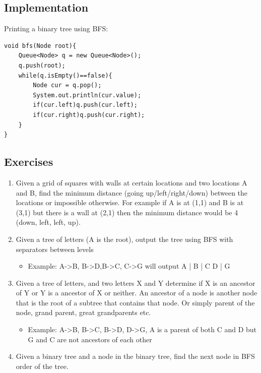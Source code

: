 \documentclass[11pt,oneside]{book}
\begin{document}
\subsection{Implementation}

Printing a binary tree using BFS:

\begin{lstlisting}
void bfs(Node root){
    Queue<Node> q = new Queue<Node>();
    q.push(root);
    while(q.isEmpty()==false){
        Node cur = q.pop();
        System.out.println(cur.value);
        if(cur.left)q.push(cur.left);
        if(cur.right)q.push(cur.right);
    }
}
\end{lstlisting}

\subsection{Exercises}

\begin{enumerate}
\item Given a grid of squares with walls at certain locations and two locations A and B, find the minimum distance (going up/left/right/down) between the locations or impossible otherwise. For example if A is at (1,1) and B is at (3,1) but there is a wall at (2,1) then the minimum distance would be 4 (down, left, left, up). 
\item Given a tree of letters (A is the root), output the tree using BFS with separators between levels

\begin{itemize}
\item Example: A->B, B->D,B->C, C->G will output A | B | C D | G 
\end{itemize}
\item Given a tree of letters, and two letters X and Y determine if X is an ancestor of Y or Y is a ancestor of X or neither. An ancestor of a node is another node that is the root of a subtree that contains that node. Or simply parent of the node, grand parent, great grandparents etc.

\begin{itemize}
\item Example: A->B, B->C, B->D, D->G,  A is a parent of both C and D but G and C are not ancestors of each other
\end{itemize}
\item Given a binary tree and a node in the binary tree, find the next node in BFS order of the tree.
\end{enumerate}
\end{document}
